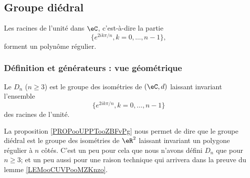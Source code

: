 \subsection{Groupe diédral}
\label{subsecHibJId}

\begin{proposition}     \label{PROPooUPPTooZBFvPg}
	Les racines de l'unité dans \( \eC\), c'est-à-dire la partie
	\begin{equation}
		\{  e^{2ik\pi/n},k=0,\ldots, n-1 \},
	\end{equation}
	forment un polynôme régulier.
\end{proposition}

\subsubsection{Définition et générateurs : vue géométrique}

\begin{definition}  \label{DEFooIWZGooAinSOh}
	Le  \( D_n\) (\( n\geq 3\)) est le groupe des isométries de \( (\eC,d)\) laissant invariant l'ensemble
	\begin{equation}
		\{  e^{2ik\pi/n},k=0,\ldots, n-1 \}
	\end{equation}
	des racines de l'unité.
\end{definition}

\begin{normaltext}
	La proposition \ref{PROPooUPPTooZBFvPg} nous permet de dire que le groupe diédral est le groupe des isométries de \( \eR^2\) laissant invariant un polygone régulier à \( n\) côtés.
	C'est un peu pour cela que nous n'avons défini \( D_n\) que pour \( n\geq 3\); et un peu aussi pour une raison technique qui arrivera dans la preuve du lemme \ref{LEMooCUVPooMZKnzo}.
\end{normaltext}

